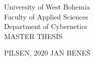 \begin{titlepage}
    \begin{boldenv}
        \begin{center}
            \vspace*{20pt}
            \LARGE
            University of West Bohemia \\
            \vspace*{5pt} Faculty of Applied Sciences  \\
            \vspace*{5pt} Department of Cybernetics\\

            \vfill
            \huge
            MASTER THESIS

            \vfill

        \end{center}
        \begin{flushleft}
            \Large
            PILSEN, 2020
            \hfill
            JAN BENEŠ
        \end{flushleft}
    \end{boldenv}
\end{titlepage}